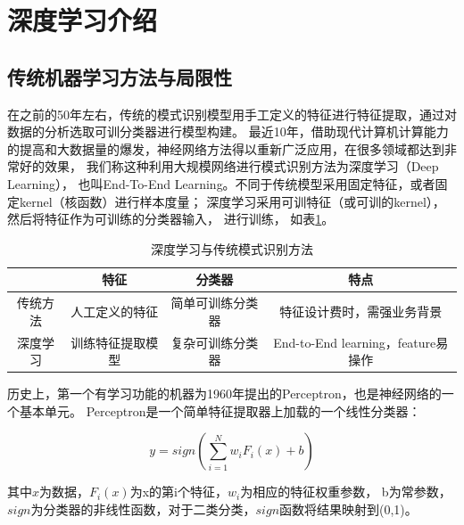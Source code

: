 \section{深度学习介绍}

\subsection{传统机器学习方法与局限性}

在之前的50年左右，传统的模式识别模型用手工定义的特征进行特征提取，通过对数据的分析选取可训分类器进行模型构建。 最近10年，借助现代计算机计算能力的提高和大数据量的爆发，神经网络方法得以重新广泛应用，在很多领域都达到非常好的效果， 我们称这种利用大规模网络进行模式识别方法为深度学习（Deep Learning）， 也叫End-To-End Learning。不同于传统模型采用固定特征，或者固定kernel（核函数）进行样本度量； 深度学习采用可训特征（或可训的kernel）， 然后将特征作为可训练的分类器输入， 进行训练， 如表\ref{Tab:dl_overview_compare}。

\begin{table}[ht]
\centering
  \begin{tabular}{|c||c|c|c|}
  \hline
   & 特征 & 分类器 & 特点\\
  \hline\hline
   传统方法 & 人工定义的特征 & 简单可训练分类器 & 特征设计费时，需强业务背景\\
  \hline
  深度学习 & 训练特征提取模型 & 复杂可训练分类器 & End-to-End learning，feature易操作\\
  \hline
  \end{tabular}
  \caption{深度学习与传统模式识别方法}
  \centering \label{Tab:dl_overview_compare}
\end{table}

历史上，第一个有学习功能的机器为1960年提出的Perceptron\cite{rosenblatt1960perceptron}，也是神经网络的一个基本单元。 Perceptron是一个简单特征提取器上加载的一个线性分类器： 


\begin{equation}
\label{Eq:Perceptron}
y=sign(\sum_{i=1}^N{w_iF_i(x)}+b)
\end{equation}


其中$x$为数据，$F_i(x)$为x的第i个特征，$w_i$为相应的特征权重参数， b为常参数， $sign$为分类器的非线性函数，对于二类分类，$sign$函数将结果映射到(0,1)。

